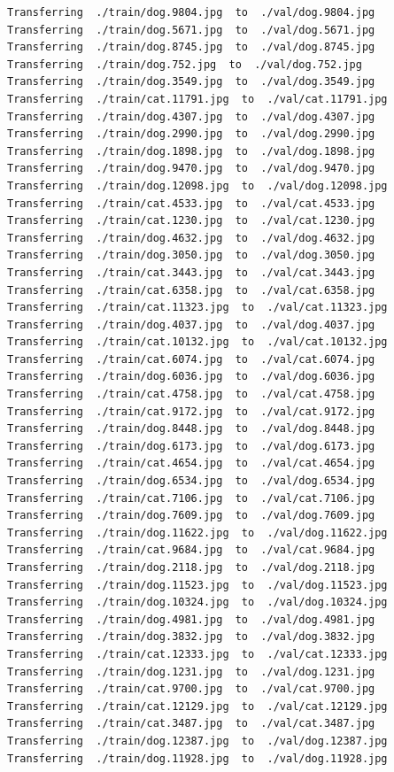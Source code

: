 \documentclass[]{book}
\theoremstyle{definition}
\theoremstyle{definition}
\theoremstyle{definition}
\theoremstyle{remark}
\begin{document}
\begin{verbatim}
Transferring  ./train/dog.9804.jpg  to  ./val/dog.9804.jpg
Transferring  ./train/dog.5671.jpg  to  ./val/dog.5671.jpg
Transferring  ./train/dog.8745.jpg  to  ./val/dog.8745.jpg
Transferring  ./train/dog.752.jpg  to  ./val/dog.752.jpg
Transferring  ./train/dog.3549.jpg  to  ./val/dog.3549.jpg
Transferring  ./train/cat.11791.jpg  to  ./val/cat.11791.jpg
Transferring  ./train/dog.4307.jpg  to  ./val/dog.4307.jpg
Transferring  ./train/dog.2990.jpg  to  ./val/dog.2990.jpg
Transferring  ./train/dog.1898.jpg  to  ./val/dog.1898.jpg
Transferring  ./train/dog.9470.jpg  to  ./val/dog.9470.jpg
Transferring  ./train/dog.12098.jpg  to  ./val/dog.12098.jpg
Transferring  ./train/cat.4533.jpg  to  ./val/cat.4533.jpg
Transferring  ./train/cat.1230.jpg  to  ./val/cat.1230.jpg
Transferring  ./train/dog.4632.jpg  to  ./val/dog.4632.jpg
Transferring  ./train/dog.3050.jpg  to  ./val/dog.3050.jpg
Transferring  ./train/cat.3443.jpg  to  ./val/cat.3443.jpg
Transferring  ./train/cat.6358.jpg  to  ./val/cat.6358.jpg
Transferring  ./train/cat.11323.jpg  to  ./val/cat.11323.jpg
Transferring  ./train/dog.4037.jpg  to  ./val/dog.4037.jpg
Transferring  ./train/cat.10132.jpg  to  ./val/cat.10132.jpg
Transferring  ./train/cat.6074.jpg  to  ./val/cat.6074.jpg
Transferring  ./train/dog.6036.jpg  to  ./val/dog.6036.jpg
Transferring  ./train/cat.4758.jpg  to  ./val/cat.4758.jpg
Transferring  ./train/cat.9172.jpg  to  ./val/cat.9172.jpg
Transferring  ./train/dog.8448.jpg  to  ./val/dog.8448.jpg
Transferring  ./train/dog.6173.jpg  to  ./val/dog.6173.jpg
Transferring  ./train/cat.4654.jpg  to  ./val/cat.4654.jpg
Transferring  ./train/dog.6534.jpg  to  ./val/dog.6534.jpg
Transferring  ./train/cat.7106.jpg  to  ./val/cat.7106.jpg
Transferring  ./train/dog.7609.jpg  to  ./val/dog.7609.jpg
Transferring  ./train/dog.11622.jpg  to  ./val/dog.11622.jpg
Transferring  ./train/cat.9684.jpg  to  ./val/cat.9684.jpg
Transferring  ./train/dog.2118.jpg  to  ./val/dog.2118.jpg
Transferring  ./train/dog.11523.jpg  to  ./val/dog.11523.jpg
Transferring  ./train/dog.10324.jpg  to  ./val/dog.10324.jpg
Transferring  ./train/dog.4981.jpg  to  ./val/dog.4981.jpg
Transferring  ./train/dog.3832.jpg  to  ./val/dog.3832.jpg
Transferring  ./train/cat.12333.jpg  to  ./val/cat.12333.jpg
Transferring  ./train/dog.1231.jpg  to  ./val/dog.1231.jpg
Transferring  ./train/cat.9700.jpg  to  ./val/cat.9700.jpg
Transferring  ./train/cat.12129.jpg  to  ./val/cat.12129.jpg
Transferring  ./train/cat.3487.jpg  to  ./val/cat.3487.jpg
Transferring  ./train/dog.12387.jpg  to  ./val/dog.12387.jpg
Transferring  ./train/dog.11928.jpg  to  ./val/dog.11928.jpg

\end{verbatim}
\end{document}
